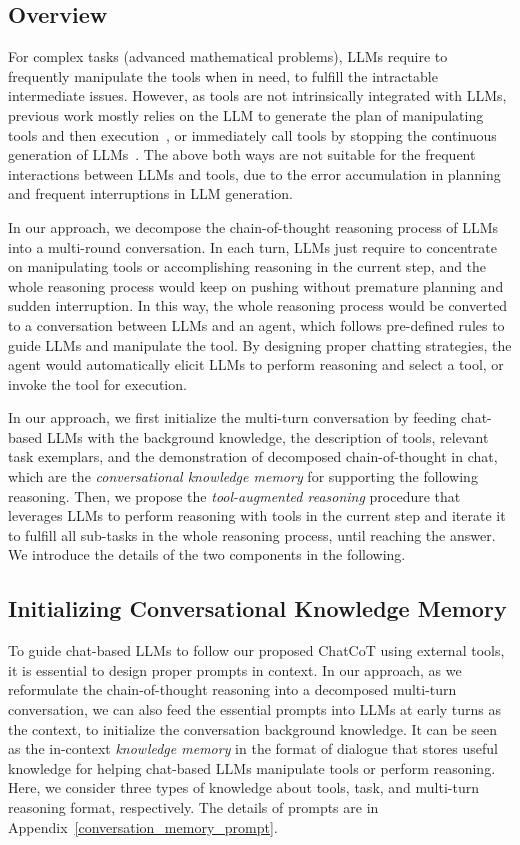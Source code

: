 \subsection{Overview}
For complex tasks (\eg advanced mathematical problems), LLMs require to frequently manipulate the tools when in need, to fulfill the intractable intermediate issues. %
However, as tools are not intrinsically integrated with LLMs, previous work mostly relies on the LLM to generate the plan of manipulating tools and then execution~\cite{PAL,lu2023chameleon}, or immediately call tools by stopping the continuous generation of LLMs~\cite{ReAct}.
The above both ways are not suitable for the frequent interactions between LLMs and tools, due to the error accumulation in planning and frequent interruptions in LLM generation.

In our approach, we decompose the chain-of-thought reasoning process of LLMs into a multi-round conversation. %
In each turn, LLMs just require to concentrate on manipulating tools or accomplishing reasoning in the current step, and the whole reasoning process would keep on pushing without premature planning and sudden interruption.
In this way, the whole reasoning process would be converted to a conversation between LLMs and an agent, which follows pre-defined rules to guide LLMs and manipulate the tool.
By designing proper chatting strategies, the agent would automatically elicit LLMs to perform reasoning and select a tool, or invoke the tool for execution.

In our approach, we first initialize the multi-turn conversation by feeding chat-based LLMs with the background knowledge, \ie the description of tools, relevant task exemplars, and the demonstration of decomposed chain-of-thought in chat, which are the \emph{conversational knowledge memory} for supporting the following reasoning.
Then, we propose the \emph{tool-augmented reasoning} procedure that leverages LLMs to perform reasoning with tools in the current step and iterate it to fulfill all sub-tasks in the whole reasoning process, until reaching the answer.
We introduce the details of the two components in the following.

\subsection{Initializing Conversational Knowledge Memory}
To guide chat-based LLMs to follow our proposed ChatCoT using external tools, it is essential to design proper prompts in context.
In our approach, as we reformulate the chain-of-thought reasoning into a decomposed multi-turn conversation, we can also feed the essential prompts into LLMs at early turns as the context, to initialize the conversation background knowledge.
It can be seen as the in-context \emph{knowledge memory} in the format of dialogue that stores useful knowledge for helping chat-based LLMs manipulate tools or perform reasoning.
Here, we consider three types of knowledge about tools, task, and multi-turn reasoning format, respectively.
The details of prompts are in Appendix~\ref{conversation_memory_prompt}.

